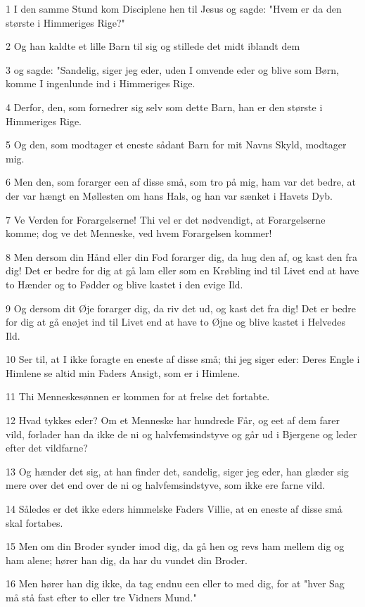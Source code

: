 \par 1 I den samme Stund kom Disciplene hen til Jesus og sagde: "Hvem er da den største i Himmeriges Rige?"
\par 2 Og han kaldte et lille Barn til sig og stillede det midt iblandt dem
\par 3 og sagde: "Sandelig, siger jeg eder, uden I omvende eder og blive som Børn, komme I ingenlunde ind i Himmeriges Rige.
\par 4 Derfor, den, som fornedrer sig selv som dette Barn, han er den største i Himmeriges Rige.
\par 5 Og den, som modtager et eneste sådant Barn for mit Navns Skyld, modtager mig.
\par 6 Men den, som forarger een af disse små, som tro på mig, ham var det bedre, at der var hængt en Møllesten om hans Hals, og han var sænket i Havets Dyb.
\par 7 Ve Verden for Forargelserne! Thi vel er det nødvendigt, at Forargelserne komme; dog ve det Menneske, ved hvem Forargelsen kommer!
\par 8 Men dersom din Hånd eller din Fod forarger dig, da hug den af, og kast den fra dig! Det er bedre for dig at gå lam eller som en Krøbling ind til Livet end at have to Hænder og to Fødder og blive kastet i den evige Ild.
\par 9 Og dersom dit Øje forarger dig, da riv det ud, og kast det fra dig! Det er bedre for dig at gå enøjet ind til Livet end at have to Øjne og blive kastet i Helvedes Ild.
\par 10 Ser til, at I ikke foragte en eneste af disse små; thi jeg siger eder: Deres Engle i Himlene se altid min Faders Ansigt, som er i Himlene.
\par 11 Thi Menneskesønnen er kommen for at frelse det fortabte.
\par 12 Hvad tykkes eder? Om et Menneske har hundrede Får, og eet af dem farer vild, forlader han da ikke de ni og halvfemsindstyve og går ud i Bjergene og leder efter det vildfarne?
\par 13 Og hænder det sig, at han finder det, sandelig, siger jeg eder, han glæder sig mere over det end over de ni og halvfemsindstyve, som ikke ere farne vild.
\par 14 Således er det ikke eders himmelske Faders Villie, at en eneste af disse små skal fortabes.
\par 15 Men om din Broder synder imod dig, da gå hen og revs ham mellem dig og ham alene; hører han dig, da har du vundet din Broder.
\par 16 Men hører han dig ikke, da tag endnu een eller to med dig, for at "hver Sag må stå fast efter to eller tre Vidners Mund."
